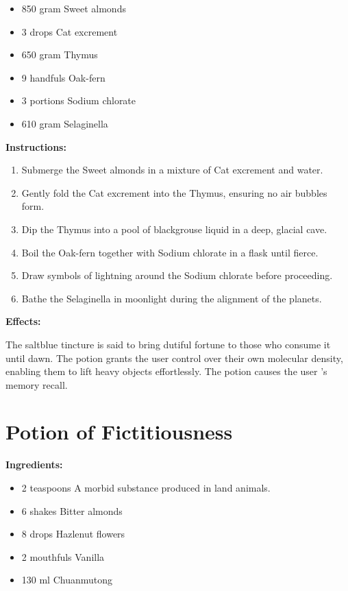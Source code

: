 \documentclass{article}
\begin{document}
\begin{itemize}
  \item 850 gram Sweet almonds
  \item 3 drops Cat excrement
  \item 650 gram Thymus
  \item 9 handfuls Oak-fern
  \item 3 portions Sodium chlorate
  \item 610 gram Selaginella
\end{itemize}

\textbf{Instructions:}

\begin{enumerate}
  \item Submerge the Sweet almonds in a mixture of Cat excrement and water.
  \item Gently fold the Cat excrement into the Thymus, ensuring no air bubbles form.
  \item Dip the Thymus into a pool of blackgrouse liquid in a deep, glacial cave.
  \item Boil the Oak-fern together with Sodium chlorate in a flask until fierce.
  \item Draw symbols of lightning around the Sodium chlorate before proceeding.
  \item Bathe the Selaginella in moonlight during the alignment of the planets.
\end{enumerate}

\textbf{Effects:}

The saltblue tincture is said to bring dutiful fortune to those who consume it until dawn. The potion grants the user control over their own molecular density, enabling them to lift heavy objects effortlessly. The potion causes the user 's memory recall.

\newpage
\section*{Potion of Fictitiousness}

\textbf{Ingredients:}

\begin{itemize}
  \item 2 teaspoons A morbid substance produced in land animals.
  \item 6 shakes Bitter almonds
  \item 8 drops Hazlenut flowers
  \item 2 mouthfuls Vanilla
  \item 130 ml Chuanmutong
\end{itemize}
\end{document}
